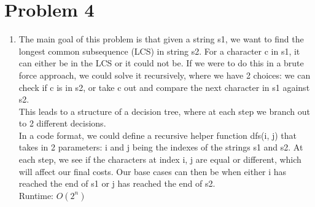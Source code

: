 \documentclass[12pt,letterpaper]{article}
\begin{document}
\section*{Problem 4}

\begin{enumerate}
  \item
    The main goal of this problem is that given a string s1, we want to find the longest common subsequence (LCS) in string s2.
    For a character c in s1, it can either be in the LCS or it could not be.
    If we were to do this in a brute force approach, we could solve it recursively, where we have 2 choices: 
    we can check if c is in s2, or take c out and compare the next character in s1 against s2. \\
    This leads to a structure of a decision tree, where at each step we branch out to 2 different decisions. \\
    In a code format, we could define a recursive helper function dfs(i, j) that takes in 2 parameters: i and j being the indexes of the strings s1 and s2.
    At each step, we see if the characters at index i, j are equal or different, which will affect our final costs. Our base cases can then be when either i has reached the end of s1 or j has reached the end of s2. \\
    
    Runtime: $O(2^n)$   \\
    

\end{enumerate}
\end{document}
